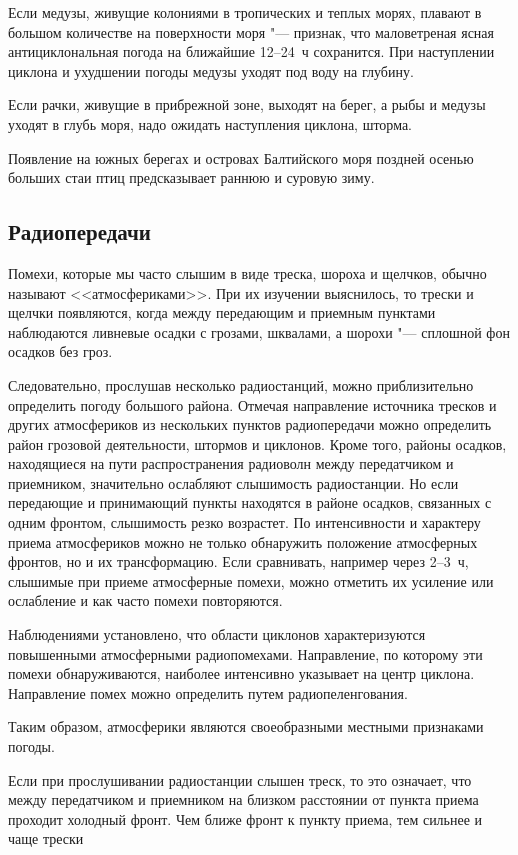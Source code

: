  Если медузы, живущие колониями в тропических и теплых морях,
плавают в большом количестве на поверхности моря "--- признак, что
маловетреная ясная антициклональная погода на ближайшие 12--24~ч
сохранится. При наступлении циклона и ухудшении погоды медузы уходят
под воду на глубину.

 Если рачки, живущие в прибрежной зоне, выходят на берег, а рыбы и
медузы уходят в глубь моря, надо ожидать наступления циклона, шторма.

 Появление на южных берегах и островах Балтийского моря поздней
осенью больших стаи птиц предсказывает раннюю и суровую зиму.

\subsection{Радиопередачи}

Помехи, которые мы часто слышим в виде треска, шороха и щелчков,
обычно называют <<атмосфериками>>. При их изучении выяснилось, то трески
и щелчки появляются, когда между передающим и приемным пунктами
наблюдаются ливневые осадки с грозами, шквалами, а шорохи "---
сплошной фон осадков без гроз.

Следовательно, прослушав несколько радиостанций, можно приблизительно
определить погоду большого района. Отмечая направление источника
тресков и других атмосфериков из нескольких пунктов радиопередачи
можно определить район грозовой деятельности, штормов и
циклонов. Кроме того, районы осадков, находящиеся на пути
распространения радиоволн между передатчиком и приемником, значительно
ослабляют слышимость радиостанции. Но если передающие и принимающий
пункты находятся в районе осадков, связанных с одним фронтом,
слышимость резко возрастет. По интенсивности и характеру приема
атмосфериков можно не только обнаружить положение атмосферных фронтов,
но и их трансформацию. Если сравнивать, например через 2--3~ч,
слышимые при приеме атмосферные помехи, можно отметить их усиление или
ослабление и как часто помехи повторяются.

Наблюдениями установлено, что области циклонов характеризуются
повышенными атмосферными радиопомехами. Направление, по которому эти
помехи обнаруживаются, наиболее интенсивно указывает на центр
циклона. Направление помех можно определить путем радиопеленгования.

Таким образом, атмосферики являются своеобразными местными признаками
погоды.

 Если при прослушивании радиостанции слышен треск, то это
означает, что между передатчиком и приемником на близком расстоянии от
пункта приема проходит холодный фронт. Чем ближе фронт к пункту
приема, тем сильнее и чаще трески

